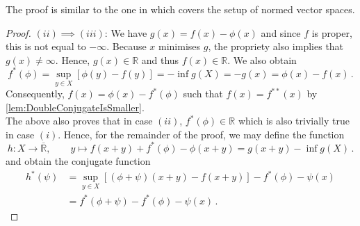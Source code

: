 \documentclass[
	paper=A4,
	pagesize=auto,
	fontsize=12pt
]{scrartcl}
\theoremstyle{plain}
\theoremstyle{remark}
\theoremstyle{definition}
\begin{document}
%
The proof is similar to the one in \cite[Theorem 3.9.1]{src:Zalinescu:ConvexAnalysisInGeneralVectorSpaces} which covers the setup of normed vector spaces.
%
\begin{proof}
$(ii) \implies (iii)$:
We have $g(x) = f(x) - \phi(x)$ and since $f$ is proper, this is not equal to $-\infty$.
Because $x$ minimises $g$, the propriety also implies that $g(x) \neq \infty$.
Hence, $g(x) \in \mathbb{R}$ and thus $f(x) \in \mathbb{R}$.
We also obtain
%
\begin{equation}
f^* \left( \phi \right)
=
\sup_{y \in X} \left[ \phi \left( y \right) - f \left( y \right) \right]
=
- \inf g \left( X \right)
=
- g \left( x \right)
=
\phi \left( x \right) - f \left( x \right) \, .
\end{equation}
%
Consequently, $f (x) = \phi(x) - f^*( \phi )$ such that $f(x) = f^{**}(x)$ by \cref{lem:DoubleConjugateIsSmaller}.\\

The above also proves that in case $(ii)$, $f^*(\phi) \in \mathbb{R}$ which is also trivially true in case $(i)$.
Hence, for the remainder of the proof, we may define the function
%
\begin{equation}
h : X \to \overline{\mathbb{R}}, \qquad y \mapsto
f \left( x + y \right) + f^* \left( \phi \right) - \phi \left( x + y \right)
=
g \left( x + y \right) - \inf g \left( X \right) \, .
\end{equation}
%
and obtain the conjugate function
%
\begin{equation}
\begin{aligned}
h^*(\psi)
&=
\sup_{y \in X} \left[ \left( \phi + \psi \right) \left( x + y \right) - f \left( x + y \right) \right]
- f^* \left( \phi \right) - \psi \left( x \right) \\
&=
f^* \left( \phi + \psi \right) - f^* \left( \phi \right) - \psi \left( x \right) \, .
\end{aligned}
\end{equation}
%


\end{proof}
\end{document}

